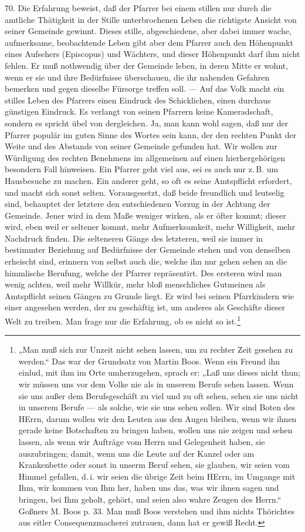 70. Die Erfahrung beweist, daß der Pfarrer bei einem stillen nur durch die amtliche Thätigkeit in der Stille unterbrochenen Leben die richtigste Ansicht von seiner Gemeinde gewinnt. Dieses stille, abgeschiedene, aber dabei immer wache, aufmerksame, beobachtende Leben gibt aber dem Pfarrer auch den Höhenpunkt eines Aufsehers (Episcopus) und Wächters, und dieser Höhenpunkt darf ihm nicht fehlen. Er muß nothwendig über der Gemeinde leben, in deren Mitte er wohnt, wenn er sie und ihre Bedürfnisse überschauen, die ihr nahenden Gefahren bemerken und gegen dieselbe Fürsorge treffen soll. — Auf das Volk macht ein stilles Leben des Pfarrers einen Eindruck des Schicklichen, einen durchaus günstigen Eindruck. Es verlangt von seinen Pfarrern keine Kameradschaft, sondern es spricht übel von dergleichen. Ja, man kann wohl sagen, daß nur der Pfarrer populär im guten Sinne des Wortes sein kann, der den
rechten Punkt der Weite und des Abstands von seiner Gemeinde gefunden hat. Wir wollen zur Würdigung des rechten Benehmens im allgemeinen auf einen hierhergehörigen besondern Fall hinweisen. Ein Pfarrer geht viel aus, sei es auch nur z.\,B. um Hausbesuche zu machen. Ein anderer geht, so oft es seine Amtspflicht erfordert, und macht sich sonst selten. Vorausgesetzt, daß beide freundlich und leutselig sind, behauptet der letztere den entschiedenen Vorzug in der Achtung der Gemeinde. Jener wird in dem Maße weniger wirken, als er öfter kommt; dieser wird, eben weil er seltener kommt, mehr Aufmerksamkeit, mehr Willigkeit, mehr Nachdruck finden. Die selteneren Gänge des letzteren, weil sie immer in bestimmter Beziehung auf Bedürfnisse der Gemeinde stehen und von denselben erheischt sind, erinnern von selbst auch die, welche ihn nur gehen sehen an die himmlische Berufung, welche der Pfarrer repräsentirt. Des ersteren wird man wenig achten, weil mehr Willkür, mehr bloß menschliches Gutmeinen als Amtspflicht seinen Gängen zu Grunde liegt. Er wird bei seinen Pfarrkindern wie einer angesehen werden, der zu geschäftig ist, um anderes als Geschäfte dieser Welt zu treiben. Man frage nur die Erfahrung, ob es nicht so ist.\footnote{„Man muß sich zur Unzeit nicht sehen lassen, um zu rechter Zeit gesehen zu werden.“ Das war der Grundsatz von Martin Boos. Wenn ein Freund ihn einlud, mit ihm im Orte umherzugehen, sprach er: „Laß uns dieses nicht thun; wir müssen uns vor dem Volke nie als in unserem Berufe sehen lassen. Wenn sie uns außer dem Berufsgeschäft zu viel und zu oft sehen, sehen sie uns nicht in unserem Berufe — als solche, wie sie uns sehen sollen. Wir sind Boten des HErrn, darum wollen wir den Leuten aus den Augen bleiben, wenn wir ihnen gerade keine Botschaften zu bringen haben, wollen uns nie zeigen und sehen lassen, als wenn wir Aufträge vom Herrn und Gelegenheit haben, sie auszubringen; damit, wenn uns die Leute auf der Kanzel oder am Krankenbette oder sonst in unserm Beruf sehen, sie glauben, wir seien vom Himmel gefallen, d.\,i. wir seien die übrige Zeit beim HErrn, im Umgange mit Ihm, wir kommen von Ihm her, haben uns das, was wir ihnen sagen und bringen, bei Ihm geholt, gehört, und seien also wahre Zeugen des Herrn.“ Goßners M. Boos p. 33. Man muß Boos verstehen und ihm nichts Thörichtes aus eitler Consequenzmacherei zutrauen, dann hat er gewiß Recht.}

